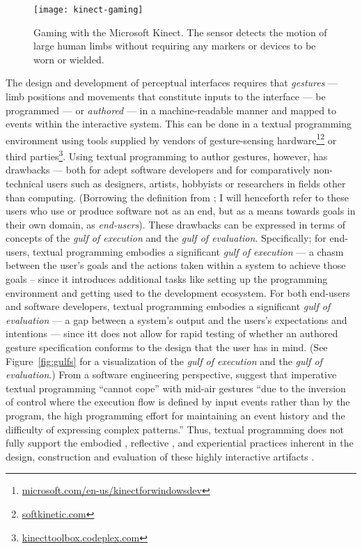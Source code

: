 \begin{SCfigure}[\sidecaptionrelwidth][ht]
\centering
\texttt{[image: kinect-gaming]}
\caption{Gaming with the Microsoft Kinect. The sensor detects the motion of large human limbs without requiring any markers or devices to be worn or wielded.}
\label{fig:kinect-gaming}
\end{SCfigure}

The design and development of perceptual interfaces requires that \emph{gestures} --- limb positions and movements that constitute inputs to the interface --- be programmed \parencite{Lu:2012} --- or \emph{authored} \parencite{Kim:2013, Hartmann:2007} --- in a machine-readable manner and mapped to events within the interactive system. This can be done in a textual programming environment using tools supplied by vendors of gesture-sensing hardware\footnote{\href{http://www.microsoft.com/en-us/kinectforwindowsdev/}{microsoft.com/en-us/kinectforwindowsdev}}\footnote{\href{http://www.softkinetic.com}{softkinetic.com}} or third parties\footnote{\href{http://kinecttoolbox.codeplex.com}{kinecttoolbox.codeplex.com}}. Using textual programming to author gestures, however, has drawbacks --- both for adept software developers and for comparatively non-technical users such as designers, artists, hobbyists or researchers in fields other than computing. (Borrowing the definition from \textcite{Ko:2011}; I will henceforth refer to these users who use or produce software not as an end, but as a means towards goals in their own domain, as \emph{end-users}). These drawbacks can be expressed in terms of  concepts of the \emph{gulf of execution} and the \emph{gulf of evaluation}. Specifically; for end-users, textual programming embodies a significant \emph{gulf of execution} --- a chasm between the user's goals and the actions taken within a system to achieve those goals – since it introduces additional tasks like setting up the programming environment and getting used to the development ecosystem. For both end-users and software developers, textual programming embodies a significant \emph{gulf of evaluation} --- a gap between a system's output and the users's expectations and intentions --- since itt does not allow for rapid testing of whether an authored gesture specification conforms to the design that the user has in mind. (See Figure~\ref{fig:gulfs} for a visualization of the \emph{gulf of execution} and the \emph{gulf of evaluation}.) From a software engineering perspective, \textcite{Hoste:2014} suggest that imperative textual programming “cannot cope” with mid-air gestures “due to the inversion of control where the execution flow is defined by input events rather than by the program, the high programming effort for maintaining an event history and the difficulty of expressing complex patterns.” Thus, textual programming does not fully support the embodied \parencite{Dourish:2004},  reflective \parencite{Schon:1984}, and experiential \parencite{Lindell:2014} practices inherent in the design, construction and evaluation \parencite{Hartmann:2006} of these highly interactive artifacts \parencite{Myers:2000, Lim:2008}.

